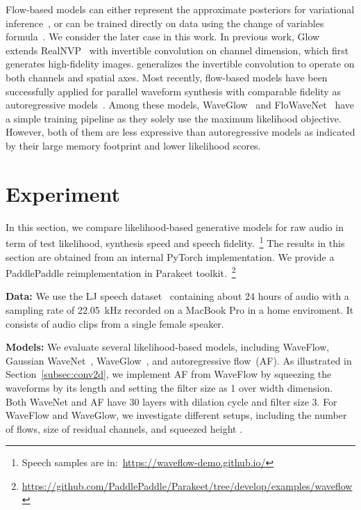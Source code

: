 \documentclass{article}
\begin{document}
Flow-based models can either represent the approximate posteriors for variational inference~\citep{rezende2015variational, kingma2016improved, berg2018sylvester}, or can be trained directly on data using the change of variables formula~\citep{dinh2014nice,dinh2016density,kingma2018glow}.
We consider the later case in this work.
In previous work, Glow~\citep{kingma2018glow} extends RealNVP~\citep{dinh2016density} with invertible  convolution on channel dimension, which first generates high-fidelity images. 
\citet{hoogeboom2019emerging} generalizes the  invertible convolution to operate on both channels and spatial axes.
Most recently, flow-based models have been successfully applied for parallel waveform synthesis with comparable fidelity as autoregressive models~\citep{oord2017parallel, ping2018clarinet, yamamoto2019probability, prenger2019waveglow, kim2018flowavenet, serra2019blow}.
Among these models, WaveGlow~\citep{prenger2019waveglow} and FloWaveNet~\citep{kim2018flowavenet} have a simple training pipeline as they solely use the maximum likelihood objective.
However, both of them are less expressive than autoregressive models as indicated by their large memory footprint and lower likelihood scores.



\section{Experiment}
\label{sec:experiment}
In this section, we compare likelihood-based generative models for raw audio in term of test likelihood, synthesis speed and speech fidelity.~\footnote{\small{Speech samples are in:~\url{https://waveflow-demo.github.io/}}}
The results in this section are obtained from an internal PyTorch implementation. We provide a PaddlePaddle reimplementation in Parakeet toolkit.~\footnote{\small{\url{https://github.com/PaddlePaddle/Parakeet/tree/develop/examples/waveflow}}}

\vspace{-.3em}
{\bf Data:} We use the LJ speech dataset~\citep{Ito2017ljspeech} containing about 24 hours of audio with a sampling rate of 22.05~kHz recorded on a MacBook Pro in a home enviroment.
It consists of  audio clips from a single female speaker.

\vspace{-.3em}
{\bf Models:}
We evaluate several likelihood-based models, including WaveFlow,  Gaussian WaveNet~\citep{ping2018clarinet}, WaveGlow~\citep{prenger2019waveglow}, and autoregressive flow~(AF). 
As illustrated in Section~\ref{subsec:conv2d}, we implement AF from WaveFlow by squeezing the waveforms by its length and setting the filter size as 1 over width dimension.
Both WaveNet and AF have 30 layers with dilation cycle  and filter size 3.
For WaveFlow and WaveGlow, we investigate different setups, including the number of flows, size of residual channels, and squeezed height .
\end{document}
